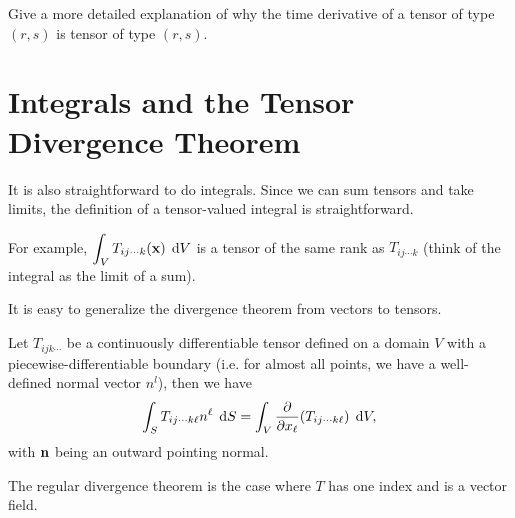 \begin{problem} 
 Give a more detailed explanation of why
the time derivative of a tensor of type $(r,s)$ is tensor of type
$(r,s)$.
\end{problem}




\section{Integrals and the Tensor Divergence Theorem}
It is also straightforward to do integrals. Since we can sum tensors and take limits, the definition of a tensor-valued integral is straightforward.

For example, $\dint_V T_{ij\cdots k}(\vector{x})\;\d V$ is a tensor of the same rank as $T_{ij\cdots k}$ (think of the integral as the limit of a sum).

It is easy to generalize the divergence theorem from vectors to tensors. 

\begin{thm}
Let $T_{ijk\dotsm}$  be a continuously differentiable tensor defined on a domain $V$ with a piecewise-differentiable boundary (i.e. for almost all points, we have a well-defined normal vector $n^l$), then we have
  \[
    \dint_S T_ {ij\cdots k\ell}n^\ell\;\d S = \dint_V \dfrac{\partial}{\partial x_\ell}(T_{ij\cdots k\ell})\;\d V,
  \]
  with $\mathbf{ n}$ being an outward pointing normal.
\end{thm}
The regular divergence theorem is the case where $T$ has one index and is a vector field.

